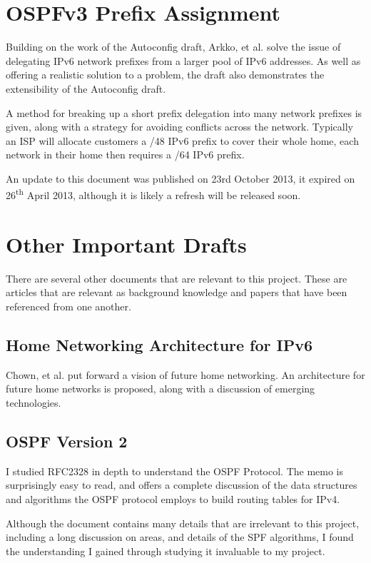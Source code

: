 \documentclass[12pt,a4paper,twoside]{report}
\begin{document}
\section{OSPFv3 Prefix Assignment}
Building on the work of the Autoconfig draft, Arkko, et
al.\cite{draft-arkko-homenet-prefix-assignment-03} solve the issue of
delegating IPv6 network prefixes from a larger pool of IPv6 addresses. As well
as offering a realistic solution to a problem, the draft also demonstrates the
extensibility of the Autoconfig draft. 

A method for breaking up a short prefix delegation into many network prefixes
is given, along with a strategy for avoiding conflicts across the network.
Typically an ISP will allocate customers a /48 IPv6 prefix to cover their
whole home, each network in their home then requires a /64 IPv6 prefix.

An update to this document was published on 23rd October 2013, it expired on
26\textsuperscript{th} April 2013, although it is likely a refresh will be
released soon.

\section{Other Important Drafts}
There are several other documents that are relevant to this project. These are
articles that are relevant as background knowledge and papers that have
been referenced from one another.

\subsection{Home Networking Architecture for IPv6} 
Chown, et al.\cite{draft-ietf-homenet-arch-07} put forward a vision of future
home networking. An architecture for future home networks is proposed, along
with a discussion of emerging technologies. 

\subsection{OSPF Version 2}
I studied RFC2328\cite{rfc2328} in depth to understand the OSPF Protocol. The
memo is surprisingly easy to read, and offers a complete discussion of the data
structures and algorithms the OSPF protocol employs to build routing tables for
IPv4. 

Although the document contains many details that are irrelevant to this project, 
including a long discussion on areas, and details of the SPF algorithms, I found
the understanding I gained through studying it invaluable to my project.
\end{document}
